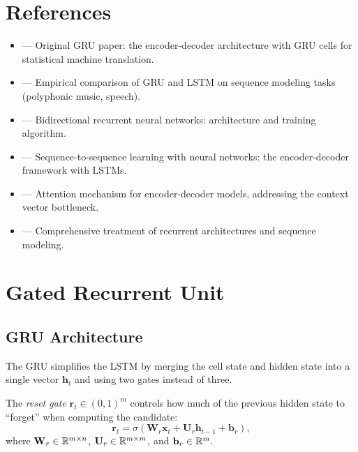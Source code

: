 \documentclass[11pt,a4paper]{article}
\begin{document}
\section{References}
\label{sec:references}

\begin{itemize}
  \item \citet{cho2014} --- Original GRU paper: the encoder-decoder
    architecture with GRU cells for statistical machine translation.
  \item \citet{chung2014} --- Empirical comparison of GRU and LSTM
    on sequence modeling tasks (polyphonic music, speech).
  \item \citet{schuster1997} --- Bidirectional recurrent neural
    networks: architecture and training algorithm.
  \item \citet{sutskever2014} --- Sequence-to-sequence learning with
    neural networks: the encoder-decoder framework with LSTMs.
  \item \citet{bahdanau2015} --- Attention mechanism for
    encoder-decoder models, addressing the context vector bottleneck.
  \item \citet[Chapter~10]{goodfellow2016} --- Comprehensive
    treatment of recurrent architectures and sequence modeling.
\end{itemize}

\section{Gated Recurrent Unit}
\label{sec:gru}

\subsection{GRU Architecture}

The GRU simplifies the LSTM by merging the cell state and hidden
state into a single vector $\mathbf{h}_t$ and using two gates
instead of three.

\begin{definition}
\label{def:reset-gate}
The \emph{reset gate} $\mathbf{r}_t \in (0, 1)^m$ controls how much
of the previous hidden state to ``forget'' when computing the
candidate:
\begin{equation}
  \boxed{\mathbf{r}_t = \sigma(\mathbf{W}_r \mathbf{x}_t +
    \mathbf{U}_r \mathbf{h}_{t-1} + \mathbf{b}_r)},
  \label{eq:reset-gate}
\end{equation}
where $\mathbf{W}_r \in \mathbb{R}^{m \times n}$,
$\mathbf{U}_r \in \mathbb{R}^{m \times m}$, and $\mathbf{b}_r \in \mathbb{R}^m$.
\end{definition}
\end{document}
